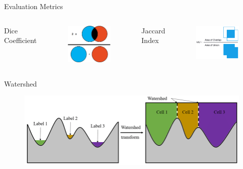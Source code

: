 \begin{frame}{Evaluation Metrics}
    \begin{columns}
        Dice Coefficient
        \begin{figure}[!htb]
            \centering
            \includegraphics[width=5cm]{figures/method/dice_coefficient}
        \end{figure}
        Jaccard Index
        \begin{figure}[!htb]
            \centering
            \includegraphics[width=5cm]{figures/method/jaccard_index}
        \end{figure}
    \end{columns}
\end{frame}


\begin{frame}{Watershed}
    \begin{figure}
        \centering
        \includegraphics[width=15cm]{figures/method/watershed}
    \end{figure}
\end{frame}
